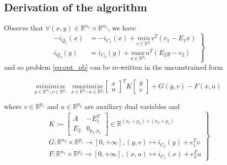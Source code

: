 \documentclass[a4paper,9pt,journal]{IEEEtran}
\begin{document}
\subsection{Derivation of the algorithm}
Observe that $\forall (x, y) \in \mathbb{R}^{n_1} \times \mathbb{R}^{n_2}$, we have
\begin{equation}
  \left .
  \begin{split}
    -i_{Q_1}(x) &= -i_{C_1}(x) + \underset{v \in \mathbb{R}^{p_1}}{min}\text{}{v^T(e_1 - E_1x)}\\
  i_{Q_2}(y) &= i_{C_2}(y) + \underset{u \in \mathbb{R}^{p_2}}{max}\text{}{u^T(E_2y - e_2)}
  \end{split}
  \right\}
\end{equation}
and so problem \eqref{eq:opt_pb} can be re-written in the unconstrained form

\begin{equation}
  \underset{y \in \mathbb{R}^{n_2}, v\in \mathbb{R}^{p_1}}{minimize}\text{ }\underset{x \in \mathbb{R}^{n_1}, u \in \mathbb{R}^{p_2}}{maximize}
           {\begin{bmatrix}x\\u\end{bmatrix}^TK\begin{bmatrix}y\\v\end{bmatrix} + G(y, v) - F(x, u)}
  \label{eq:my_opt_pb}
\end{equation}

where $v \in \mathbb{R}^{p_1}$ and $u \in \mathbb{R}^{p_2}$ are auxiliary dual variables and 
\begin{equation}
  \left .
  \begin{split}
    K :=
    \left[
      \begin{array}{c|c}
        A & -E_1^T \\ \hline
        E_2 & 0_{p_2, p_1}
      \end{array}
      \right] \in \mathbb{R}^{(n_1 + p_2) \times (n_2 + p_1)} \\
      G: \mathbb{R}^{n_2} \times \mathbb{R}^{p_1} \rightarrow [0, +\infty], (y, v) \mapsto i_{C_2}(y) + e_1^Tv\\
      F: \mathbb{R}^{n_1} \times \mathbb{R}^{p_2} \rightarrow [0, +\infty], (x, u) \mapsto i_{C_1}(x) + e_2^Tu
  \end{split}
  \right\}
  \label{eq:unconstrained_pb}
\end{equation}
\end{document}
